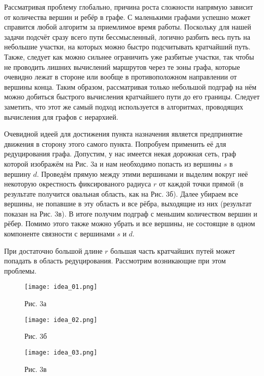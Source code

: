 \documentclass[12pt]{article}
\begin{document}
Рассматривая проблему глобально, причина роста сложности напрямую зависит от количества вершин и ребёр в графе. С маленькими графами успешно может справится любой алгоритм за приемлимое время работы. Поскольку для нашей задачи подсчёт сразу всего пути бессмысленный, логично разбить весь путь на небольшие участки, на которых можно быстро подсчитывать кратчайший путь. Также, следует как можно сильнее ограничить уже разбитые участки, так чтобы не проводить лишних вычислений маршрутов через те зоны графа, которые очевидно лежат в стороне или вообще в противоположном направлении от вершины конца. Таким образом, рассматривая только небольшой подграф на нём можно добиться быстрого вычисления кратчайшего пути до его границы. Следует заметить, что этот же самый подход используется в алгоритмах, проводящих вычисления для графов с иерархией.

\pagebreak

Очевидной идеей для достижения пункта назначения является предпринятие движения в сторону этого самого пункта. Попробуем применить её для редуцирования графа. Допустим, у нас имеется некая дорожная сеть, граф которой изображём на Рис. 3а и нам необходимо попасть из вершины $s$ в вершину $d$. Проведём прямую между этими вершинами и выделим вокруг неё некоторую окрестность фиксированого радиуса $r$ от каждой точки прямой (в результате получится овальная область, как на Рис. 3б). Далее убираем все вершины, не попавшие в эту область и все рёбра, выходящие из них (результат показан на Рис. 3в). В итоге получим подграф с меньшим количеством вершин и рёбер. Помимо этого также можно убрать и все вершины, не состоящие в одном компоненте связности с вершинами $s$ и $d$. 

При достаточно большой длине $r$ большая часть кратчайших путей может попадать в область редуцирования. Рассмотрим возникающие при этом проблемы.

\begin{figure}
  \texttt{[image: idea\_01.png]}
    \begin{center}
        Рис. 3а
    \end{center}
\endminipage\hfill
{}
  \texttt{[image: idea\_02.png]}
        \begin{center}
        Рис. 3б
    \end{center}
\endminipage\hfill
{}
  \texttt{[image: idea\_03.png]}
    \begin{center}
        Рис. 3в
    \end{center}
\endminipage
\end{figure}
\end{document}
